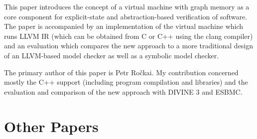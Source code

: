 This paper introduces the concept of a virtual machine with graph memory as a core component for explicit-state and abstraction-based verification of software.
The paper is accompanied by an implementation of the virtual machine which runs LLVM IR (which can be obtained from C or C++ using the clang compiler) and an evaluation which compares the new approach to a more traditional design of an LLVM-based model checker as well as a symbolic model checker.

\contrib The primary author of this paper is Petr Ročkai.
My contribution concerned mostly the C++ support (including program compilation and libraries) and the evaluation and comparison of the new approach with DIVINE 3 and ESBMC.

\bigskip\noindent{}



\section{Other Papers}

\bigskip\noindent{}

\bigskip\noindent{}

\bigskip\noindent{}

\bigskip\noindent{}

\bigskip\noindent{}

\bigskip\noindent{}

\bigskip\noindent{}

\bigskip\noindent{}
